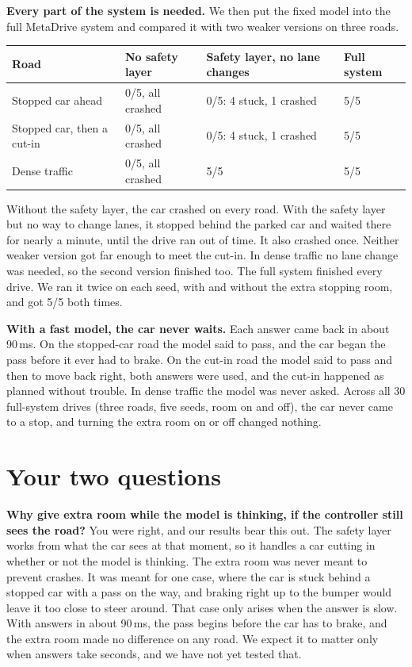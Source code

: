 \documentclass[11pt]{article}
\begin{document}
\textbf{Every part of the system is needed.} We then put the fixed model into the full MetaDrive system and compared it with two weaker versions on three roads.

\begin{table}[h]
\centering\small
\vspace{-0.3em}
\begin{tabular}{llll}
\toprule
Road & No safety layer & Safety layer, no lane changes & Full system \\
\midrule
Stopped car ahead & 0/5, all crashed & 0/5: 4 stuck, 1 crashed & 5/5 \\
Stopped car, then a cut-in & 0/5, all crashed & 0/5: 4 stuck, 1 crashed & 5/5 \\
Dense traffic & 0/5, all crashed & 5/5 & 5/5 \\
\bottomrule
\end{tabular}
\vspace{-0.5em}
\end{table}

Without the safety layer, the car crashed on every road. With the safety layer but no way to change lanes, it stopped behind the parked car and waited there for nearly a minute, until the drive ran out of time. It also crashed once. Neither weaker version got far enough to meet the cut-in. In dense traffic no lane change was needed, so the second version finished too. The full system finished every drive. We ran it twice on each seed, with and without the extra stopping room, and got 5/5 both times.

\textbf{With a fast model, the car never waits.} Each answer came back in about 90\,ms. On the stopped-car road the model said to pass, and the car began the pass before it ever had to brake. On the cut-in road the model said to pass and then to move back right, both answers were used, and the cut-in happened as planned without trouble. In dense traffic the model was never asked. Across all 30 full-system drives (three roads, five seeds, room on and off), the car never came to a stop, and turning the extra room on or off changed nothing.

\section{Your two questions}
\textbf{Why give extra room while the model is thinking, if the controller still sees the road?} You were right, and our results bear this out. The safety layer works from what the car sees at that moment, so it handles a car cutting in whether or not the model is thinking. The extra room was never meant to prevent crashes. It was meant for one case, where the car is stuck behind a stopped car with a pass on the way, and braking right up to the bumper would leave it too close to steer around. That case only arises when the answer is slow. With answers in about 90\,ms, the pass begins before the car has to brake, and the extra room made no difference on any road. We expect it to matter only when answers take seconds, and we have not yet tested that.
\end{document}
